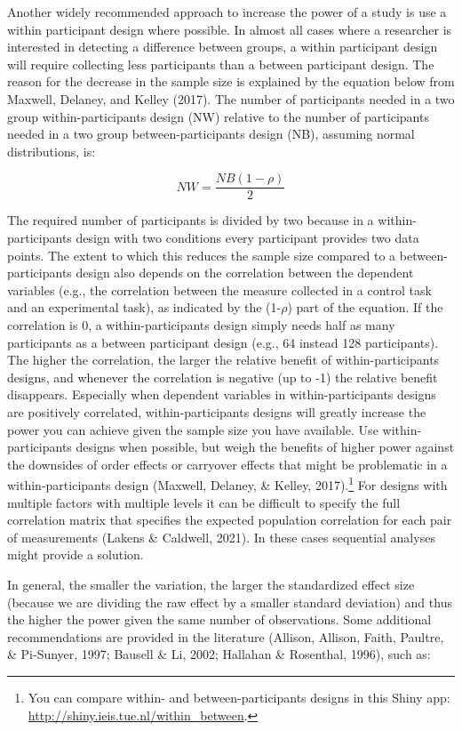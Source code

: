 \documentclass[
  english,
  ,jou,floatsintext]{apa6}
\begin{document}
Another widely recommended approach to increase the power of a study is use a within participant design where possible. In almost all cases where a researcher is interested in detecting a difference between groups, a within participant design will require collecting less participants than a between participant design. The reason for the decrease in the sample size is explained by the equation below from Maxwell, Delaney, and Kelley (2017). The number of participants needed in a two group within-participants design (NW) relative to the number of participants needed in a two group between-participants design (NB), assuming normal distributions, is:

\[NW = \frac{NB (1-\rho)}{2}\]

The required number of participants is divided by two because in a within-participants design with two conditions every participant provides two data points. The extent to which this reduces the sample size compared to a between-participants design also depends on the correlation between the dependent variables (e.g., the correlation between the measure collected in a control task and an experimental task), as indicated by the (1-\(\rho\)) part of the equation. If the correlation is 0, a within-participants design simply needs half as many participants as a between participant design (e.g., 64 instead 128 participants). The higher the correlation, the larger the relative benefit of within-participants designs, and whenever the correlation is negative (up to -1) the relative benefit disappears. Especially when dependent variables in within-participants designs are positively correlated, within-participants designs will greatly increase the power you can achieve given the sample size you have available. Use within-participants designs when possible, but weigh the benefits of higher power against the downsides of order effects or carryover effects that might be problematic in a within-participants design (Maxwell, Delaney, \& Kelley, 2017).\footnote{You can compare within- and between-participants designs in this Shiny app: \url{http://shiny.ieis.tue.nl/within_between}.} For designs with multiple factors with multiple levels it can be difficult to specify the full correlation matrix that specifies the expected population correlation for each pair of measurements (Lakens \& Caldwell, 2021). In these cases sequential analyses might provide a solution.

In general, the smaller the variation, the larger the standardized effect size (because we are dividing the raw effect by a smaller standard deviation) and thus the higher the power given the same number of observations. Some additional recommendations are provided in the literature (Allison, Allison, Faith, Paultre, \& Pi-Sunyer, 1997; Bausell \& Li, 2002; Hallahan \& Rosenthal, 1996), such as:
\end{document}
